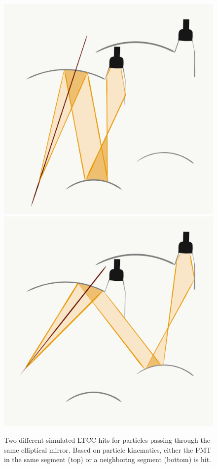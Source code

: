 \begin{figure}
  \centering
  \includegraphics[width=0.99\columnwidth,keepaspectratio]{img/LTCC-event-1.png}
  \includegraphics[width=0.99\columnwidth,keepaspectratio]{img/LTCC-event-2.png}
  \caption{Two different simulated LTCC hits for particles passing through the same
  elliptical mirror.
  Based on particle kinematics, either the PMT in the same segment (top) or a neighboring
  segment (bottom) is hit.}
  \label{fig:trackmatching}
\end{figure}

